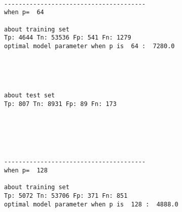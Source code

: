 \documentclass[11pt]{article}
\begin{document}
    \begin{center}
    \end{center}
    { \hspace*{\fill} \\}
    
    \begin{Verbatim}[commandchars=\\\{\}]



---------------------------------------
when p=  64

about training set
Tp: 4644 Tn: 53536 Fp: 541 Fn: 1279
optimal model parameter when p is  64 :  7280.0

    \end{Verbatim}

    \begin{center}
    \end{center}
    { \hspace*{\fill} \\}
    
    \begin{Verbatim}[commandchars=\\\{\}]


about test set
Tp: 807 Tn: 8931 Fp: 89 Fn: 173

    \end{Verbatim}

    \begin{center}
    \end{center}
    { \hspace*{\fill} \\}
    
    \begin{Verbatim}[commandchars=\\\{\}]



---------------------------------------
when p=  128

about training set
Tp: 5072 Tn: 53706 Fp: 371 Fn: 851
optimal model parameter when p is  128 :  4888.0

    \end{Verbatim}

    \begin{center}
    \end{center}
    { \hspace*{\fill} \\}
    
\end{document}
